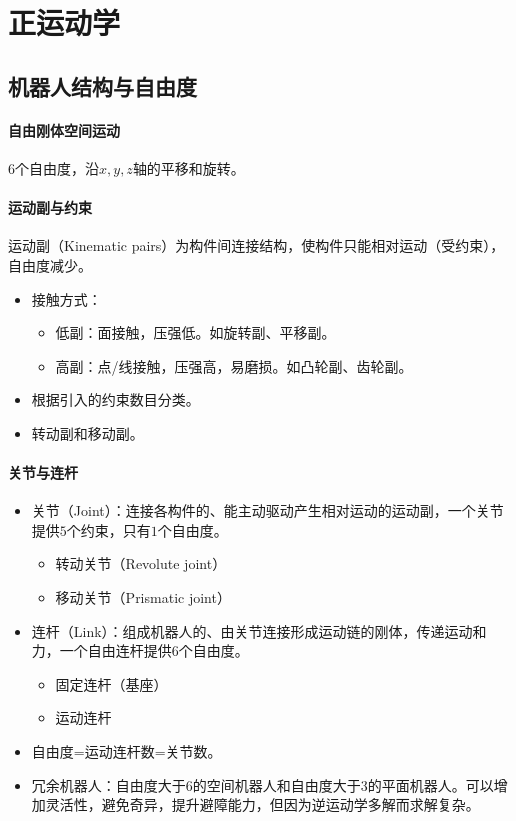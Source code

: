 \documentclass[
12pt, %
a4paper, 
oneside, %
headinclude,footinclude, %
]{scrartcl}
\begin{document}
\section{正运动学}
\subsection[机器人结构与自由度]{机器人结构与自由度}
\paragraph{自由刚体空间运动}
6个自由度，沿$ x,y,z $轴的平移和旋转。
\paragraph{运动副与约束}
运动副（Kinematic pairs）为构件间连接结构，使构件只能相对运动（受约束），自由度减少。
\begin{itemize}
\item 接触方式：
\begin{itemize}
\item 低副：面接触，压强低。如旋转副、平移副。
\item 高副：点/线接触，压强高，易磨损。如凸轮副、齿轮副。
\end{itemize}
\item 根据引入的约束数目分类。
\item 转动副和移动副。
\end{itemize}
\paragraph{关节与连杆}
\begin{itemize}
\item 关节（Joint）：连接各构件的、能主动驱动产生相对运动的运动副，一个关节提供$ 5 $个约束，只有$ 1 $个自由度。
\begin{itemize}
\item 转动关节（Revolute joint）
\item 移动关节（Prismatic joint）
\end{itemize}
\item 连杆（Link）：组成机器人的、由关节连接形成运动链的刚体，传递运动和力，一个自由连杆提供$ 6 $个自由度。
\begin{itemize}
\item 固定连杆（基座）
\item 运动连杆
\end{itemize}
\item 自由度=运动连杆数=关节数。
\item 冗余机器人：自由度大于$ 6 $的空间机器人和自由度大于$ 3 $的平面机器人。可以增加灵活性，避免奇异，提升避障能力，但因为逆运动学多解而求解复杂。
\end{itemize}
\end{document}
